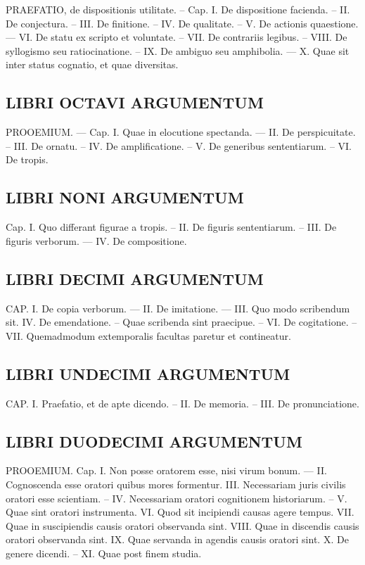 PRAEFATIO, de dispositionis utilitate. – Cap. I. De dispositione facienda. – II. De conjectura. – III. De finitione. – IV. De qualitate. – V. De actionis quaestione. — VI. De statu ex scripto et voluntate. – VII. De contrariis legibus. – VIII. De syllogismo seu ratiocinatione. – IX. De ambiguo seu amphibolia. — X. Quae sit inter status cognatio, et quae diversitas.

\subsection*{LIBRI OCTAVI ARGUMENTUM}

PROOEMIUM. — Cap. I. Quae in elocutione spectanda. — II. De perspicuitate. – III. De ornatu. – IV. De amplificatione. – V. De generibus sententiarum. – VI. De tropis.

\subsection*{LIBRI NONI ARGUMENTUM}

Cap. I. Quo differant figurae a tropis. – II. De figuris sententiarum. – III. De figuris verborum. — IV. De compositione.

\subsection*{LIBRI DECIMI ARGUMENTUM}

CAP. I. De copia verborum. — II. De imitatione. — III. Quo modo scribendum sit. IV. De emendatione. – Quae scribenda sint praecipue. – VI. De cogitatione. – VII. Quemadmodum extemporalis facultas paretur et contineatur.

\subsection*{LIBRI UNDECIMI ARGUMENTUM}

CAP. I. Praefatio, et de apte dicendo. – II. De memoria. – III. De pronunciatione.

\subsection*{LIBRI DUODECIMI ARGUMENTUM}

PROOEMIUM. Cap. I. Non posse oratorem esse, nisi virum bonum. — II. Cognoscenda esse oratori quibus mores formentur. III. Necessariam juris civilis oratori esse scientiam. – IV. Necessariam oratori cognitionem historiarum. – V. Quae sint oratori instrumenta. VI. Quod sit incipiendi causas agere tempus. VII. Quae in suscipiendis causis oratori observanda sint. VIII. Quae in discendis causis oratori observanda sint. IX. Quae servanda in agendis causis oratori sint. X. De genere dicendi. – XI. Quae post finem studia.



